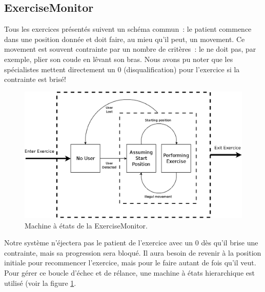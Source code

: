 \subsection{ExerciseMonitor}

Tous les exercices présentés suivent un schéma commun~: le patient commence dans
une position donnée et doit faire, au mieu qu'il peut, un movement. Ce movement
est souvent contrainte par un nombre de critères~: le ne doit pas, par exemple,
plier son coude en lêvant son bras. Nous avons pu noter que les spécialistes 
mettent directement un 0
(disqualification) pour l'exercice si la contrainte est brisé!

\begin{figure}[h!]
\centering
\includegraphics[width=0.9\linewidth]{images/exercise_monitor}
\caption{Machine à états de la ExerciseMonitor.}
\label{fig:exercise_monitor}
\end{figure}

Notre système n'éjectera pas le patient de l'exercice avec un 0 dès qu'il brise 
une contrainte, mais sa progression sera bloqué. Il aura besoin de revenir à la
position initiale pour recommencer l'exercice, mais pour le faire autant de fois
qu'il veut. Pour gérer ce boucle d'échec et de rélance, une machine à états
hierarchique est utilisé (voir la figure \ref{fig:exercise_monitor}.
    
